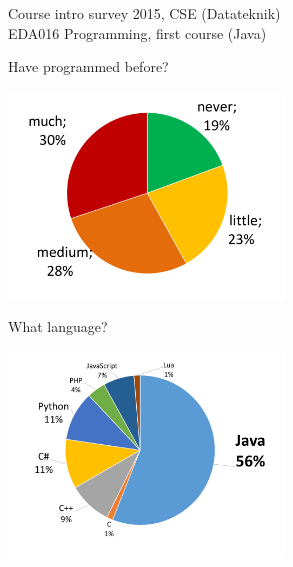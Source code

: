 \documentclass{lecturenotes}
\begin{document}
\begin{Slide}{Course intro survey 2015, CSE (Datateknik)\\EDA016 Programming, first course (Java)}
\begin{multicols}{2}
Have programmed before? \vspace{1em}

\includegraphics[width=0.55\textwidth]{survey-2015}
\columnbreak

\raggedleft What language?  \vspace{1em}

\includegraphics[width=0.55\textwidth]{lang-2015}
\end{multicols}
\end{Slide}
\end{document}
